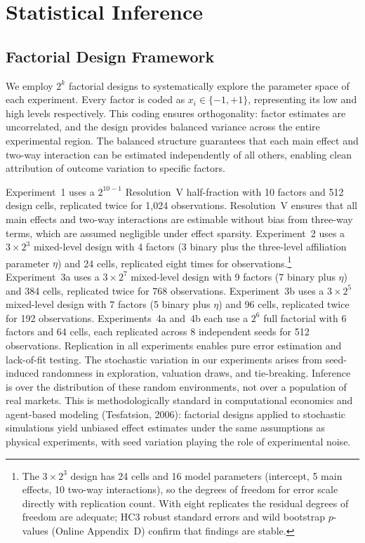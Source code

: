 \section{Statistical Inference}
\label{sec:inference}

\subsection{Factorial Design Framework}

We employ $2^k$ factorial designs to systematically explore the parameter space of each experiment. Every factor is coded as $x_i \in \{-1, +1\}$, representing its low and high levels respectively. This coding ensures orthogonality: factor estimates are uncorrelated, and the design provides balanced variance across the entire experimental region. The balanced structure guarantees that each main effect and two-way interaction can be estimated independently of all others, enabling clean attribution of outcome variation to specific factors.

Experiment~1 uses a $2^{10-1}$ Resolution~V half-fraction with 10 factors and 512 design cells, replicated twice for 1{,}024 observations. Resolution~V ensures that all main effects and two-way interactions are estimable without bias from three-way terms, which are assumed negligible under effect sparsity. Experiment~2 uses a $3 \times 2^3$ mixed-level design with 4 factors (3 binary plus the three-level affiliation parameter $\eta$) and 24 cells, replicated eight times for \ExpTwoNobs{} observations.\footnote{The $3 \times 2^3$ design has 24 cells and 16 model parameters (intercept, 5 main effects, 10 two-way interactions), so the degrees of freedom for error scale directly with replication count. With eight replicates the residual degrees of freedom are adequate; HC3 robust standard errors and wild bootstrap $p$-values (Online Appendix~D) confirm that findings are stable.}
Experiment~3a uses a $3 \times 2^7$ mixed-level design with 9 factors (7 binary plus $\eta$) and 384 cells, replicated twice for 768 observations. Experiment~3b uses a $3 \times 2^5$ mixed-level design with 7 factors (5 binary plus $\eta$) and 96 cells, replicated twice for 192 observations. Experiments~4a and~4b each use a $2^6$ full factorial with 6 factors and 64 cells, each replicated across 8 independent seeds for 512 observations. Replication in all experiments enables pure error estimation and lack-of-fit testing. The stochastic variation in our experiments arises from seed-induced randomness in exploration, valuation draws, and tie-breaking. Inference is over the distribution of these random environments, not over a population of real markets. This is methodologically standard in computational economics and agent-based modeling (Tesfatsion, 2006): factorial designs applied to stochastic simulations yield unbiased effect estimates under the same assumptions as physical experiments, with seed variation playing the role of experimental noise.

